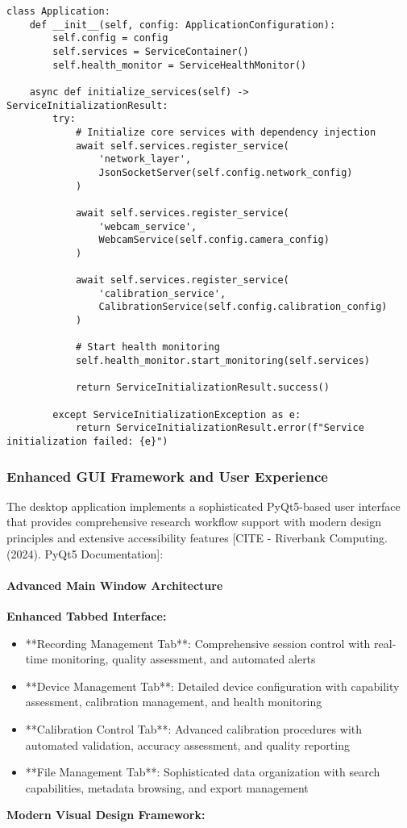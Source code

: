 \documentclass[11pt,a4paper]{report}
\begin{document}
\begin{verbatim}
class Application:
    def __init__(self, config: ApplicationConfiguration):
        self.config = config
        self.services = ServiceContainer()
        self.health_monitor = ServiceHealthMonitor()

    async def initialize_services(self) -> ServiceInitializationResult:
        try:
            # Initialize core services with dependency injection
            await self.services.register_service(
                'network_layer',
                JsonSocketServer(self.config.network_config)
            )

            await self.services.register_service(
                'webcam_service',
                WebcamService(self.config.camera_config)
            )

            await self.services.register_service(
                'calibration_service',
                CalibrationService(self.config.calibration_config)
            )

            # Start health monitoring
            self.health_monitor.start_monitoring(self.services)

            return ServiceInitializationResult.success()

        except ServiceInitializationException as e:
            return ServiceInitializationResult.error(f"Service initialization failed: {e}")
\end{verbatim}

\subsubsection{Enhanced GUI Framework and User Experience}

The desktop application implements a sophisticated PyQt5-based user interface that provides comprehensive research
workflow support with modern design principles and extensive accessibility
features [CITE - Riverbank Computing. (2024). PyQt5 Documentation]:

\paragraph{Advanced Main Window Architecture}

\textbf{Enhanced Tabbed Interface:}

\begin{itemize}
\item **Recording Management Tab**: Comprehensive session control with real-time monitoring, quality assessment, and
  automated alerts
\item **Device Management Tab**: Detailed device configuration with capability assessment, calibration management, and
  health monitoring
\item **Calibration Control Tab**: Advanced calibration procedures with automated validation, accuracy assessment, and
  quality reporting
\item **File Management Tab**: Sophisticated data organization with search capabilities, metadata browsing, and export
  management

\end{itemize}
\textbf{Modern Visual Design Framework:}
\end{document}
